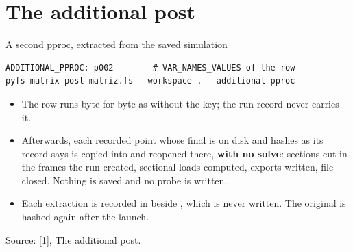 %
\section{The additional post}

\begin{frame}[fragile]{A second pproc, extracted from the saved simulation}
\begin{lstlisting}[style=ftsbase]
ADDITIONAL_PPROC: p002        # VAR_NAMES_VALUES of the row
pyfs-matrix post matriz.fs --workspace . --additional-pproc
\end{lstlisting}
\begin{itemize}\small
  \item The row runs byte for byte as without the key; the run record never
        carries it.
  \item Afterwards, each recorded point whose final  is on disk and
        hashes as its record says is copied into
         and reopened there,
        \textbf{with no solve}: sections cut in the frames the run created,
        sectional loads computed, exports written, file closed. Nothing is
        saved and no probe is written.
  \item Each extraction is recorded in  beside
        , which is never written. The original  is
        hashed again after the launch.
\end{itemize}
{\tiny\color{SoftGray} Source:
 [1], The additional post.\par}
\end{frame}

